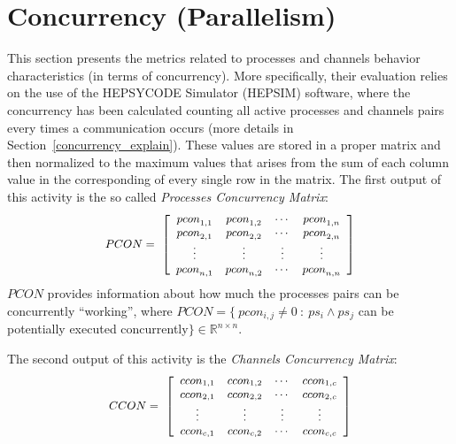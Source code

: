 %
%
\section{Concurrency (Parallelism)}\label{comm_con_metric_eval}
%
This section presents the metrics related to processes and channels behavior characteristics (in terms of concurrency). More specifically, their evaluation relies on the use of the HEPSYCODE Simulator (HEPSIM) software, where the concurrency has been calculated counting all active processes and channels pairs every times a communication occurs (more details in Section~\ref{concurrency_explain}). 
These values are stored in a proper matrix and then normalized to the maximum values that arises from the sum of each column value in the corresponding of every single row in the matrix. The first output of this activity is the so called \textit{Processes Concurrency Matrix}:
%
\begin{equation} \label{eq4}
\small
\begin{aligned}
	{PCON}=\ \left[  
	\begin{array}{cccc}
	{pcon}_{1,1} & {pcon}_{1,2} & \cdots  & {pcon}_{1,n} \\ 
	{pcon}_{2,1} & {pcon}_{2,2} & \cdots  & {pcon}_{2,n} \\ 
	\vdots      & \vdots      & \vdots  & \vdots  \\ 
	{pcon}_{n,1} & {pcon}_{n,2} & \cdots  & {pcon}_{n,n} 
	\end{array}
    \right]   \\ 
\end{aligned}
\end{equation}
%
$PCON$ provides information about how much the processes pairs can be concurrently ``working'', where $PCON = \{ \ pcon_{i,j} \neq 0 \ : \ ps_{i} \land ps_{j}$ can be potentially executed concurrently$\} \in \mathbb{R}^{n \times n}$. \par
The second output of this activity is the \textit{Channels Concurrency Matrix}:
%
\begin{equation} \label{eq4_ch}
\small
\begin{aligned}
	{CCON}=\ \left[  
	\begin{array}{cccc}
	{ccon}_{1,1} & {ccon}_{1,2} & \cdots  & {ccon}_{1,c} \\ 
	{ccon}_{2,1} & {ccon}_{2,2} & \cdots  & {ccon}_{2,c} \\ 
	\vdots      & \vdots      & \vdots  & \vdots  \\ 
	{ccon}_{c,1} & {ccon}_{c,2} & \cdots  & {ccon}_{c,c} 
	\end{array}
    \right]   \\ 
\end{aligned}
\end{equation}
